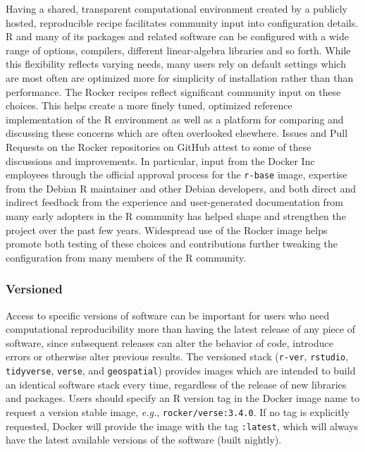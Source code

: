Having a shared, transparent computational environment created by a
publicly hosted, reproducible recipe facilitates community input into
configuration details. R and many of its packages and related software
can be configured with a wide range of options, compilers, different
linear-algebra libraries and so forth. While this flexibility reflects
varying needs, many users rely on default settings which are most often
are optimized more for simplicity of installation rather than than
performance. The Rocker recipes reflect significant community input on
these choices. This helps create a more finely tuned, optimized
reference implementation of the R environment as well as a platform for
comparing and discussing these concerns which are often overlooked
elsewhere. Issues and Pull Requests on the Rocker repositories on GitHub
attest to some of these discussions and improvements. In particular,
input from the Docker Inc employees through the official approval
process for the \texttt{r-base} image, expertise from the Debian R
maintainer and other Debian developers, and both direct and indirect
feedback from the experience and user-generated documentation from many
early adopters in the R community has helped shape and strengthen the
project over the past few years. Widespread use of the Rocker image
helps promote both testing of these choices and contributions further
tweaking the configuration from many members of the R community.

\subsubsection{Versioned}\label{versioned}

Access to specific versions of software can be important for users who
need computational reproducibility more than having the latest release
of any piece of software, since subsequent releases can alter the
behavior of code, introduce errors or otherwise alter previous results.
The versioned stack (\texttt{r-ver}, \texttt{rstudio},
\texttt{tidyverse}, \texttt{verse}, and \texttt{geospatial}) provides
images which are intended to build an identical software stack every
time, regardless of the release of new libraries and packages. Users
should specify an R version tag in the Docker image name to request a
version stable image, \emph{e.g.}, \texttt{rocker/verse:3.4.0}. If no
tag is explicitly requested, Docker will provide the image with the tag
\texttt{:latest}, which will always have the latest available versions
of the software (built nightly).

